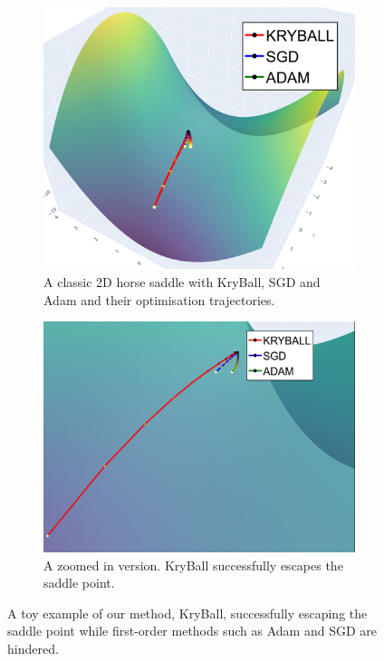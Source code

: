 \begin{figure}[h]
  \begin{subfigure}[b]{0.49\linewidth}
      \centering
      \includegraphics[width=\linewidth]{figures/0intro/intro1.png}
      \caption{A classic 2D horse saddle with KryBall, SGD and Adam and their optimisation trajectories.}
      \label{fig:toy_example_left}
  \end{subfigure}
  \hfill
  \begin{subfigure}[b]{0.49\linewidth}
      \centering
      \includegraphics[width=\linewidth]{figures/0intro/intro2.png}
      \caption{A zoomed in version. KryBall successfully escapes the saddle point.}
      \label{fig:toy_example_right}
  \end{subfigure}
  \caption{A toy example of our method, KryBall, successfully escaping the saddle point while first-order methods such as Adam and SGD are hindered.}
  \label{fig:toy_example}
\end{figure}

